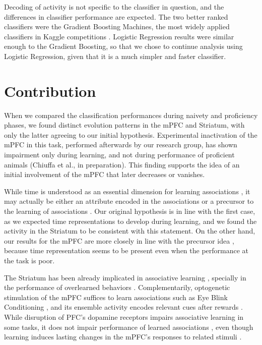 Decoding of activity is not specific to the classifier in question, and the differences in classifier performance are expected. The two better ranked classifiers were the Gradient Boosting Machines, the most widely applied classifiers in Kaggle competitions \cite{chen2016xgboost, ke2017lightgbm}. Logistic Regression results were similar enough to the Gradient Boosting, so that we chose to continue analysis using Logistic Regression, given that it is a much simpler and faster classifier.

\section{Contribution}
When we compared the classification performances during naivety and proficiency phases, we found distinct evolution patterns in the mPFC and Striatum, with only the latter agreeing to our initial hypothesis. Experimental inactivation of the mPFC in this task, performed afterwards by our research group, has shown impairment only during learning, and not during performance of proficient animals (Chiuffa et al., in preparation). This finding supports the idea of an initial involvement of the mPFC that later decreases or vanishes. 

While time is understood as an essential dimension for learning associations \cite{balsam2009temporal,kirkpatrick2016associative}, it may actually be either an attribute encoded in the associations \cite{molet2014timing} or a precursor to the learning of associations \cite{balsam2002timing}. Our original hypothesis is in line with the first case, as we expected time representations to develop during learning, and we found the activity in the Striatum to be consistent with this statement. On the other hand, our results for the mPFC are more closely in line with the precursor idea \cite{balsam2002timing}, because time representation seems to be present even when the performance at the task is poor. 

The Striatum has been already implicated in associative learning \cite{li2011differential,liljeholm2012contributions}, specially in the performance of overlearned behaviors \cite{smith2013dual}. Complementarily, optogenetic stimulation of the mPFC suffices to learn associations such as Eye Blink Conditioning \cite{wu2015optogenetic}, and its ensemble activity encodes relevant cues after rewards \cite{maggi2018ensemble}. While disruption of PFC's dopamine receptors impairs associative learning in some tasks, it does not impair performance of learned associations \cite{puig2012role, puig2014prefrontal}, even though learning induces lasting changes in the mPFC's responses to related stimuli \cite{takehara2008spontaneous}.

